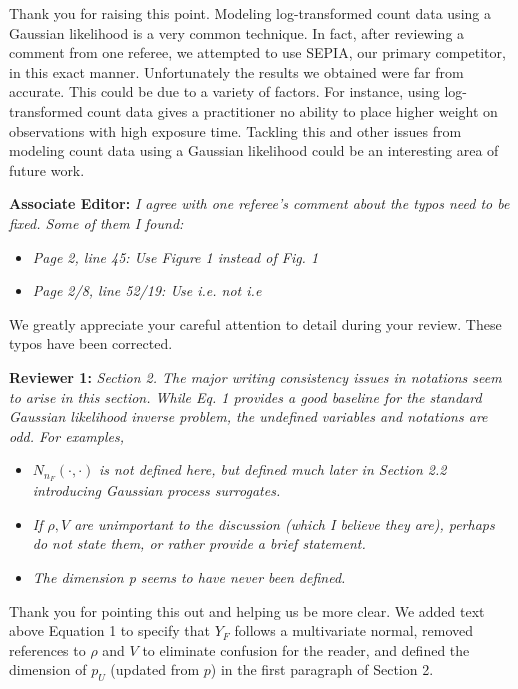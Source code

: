 \documentclass[12pt]{article}
\begin{document}
\bigskip
\noindent
Thank you for raising this point. Modeling log-transformed count data using a
Gaussian likelihood is a very common technique. In fact, after reviewing a
comment from one referee, we attempted to use SEPIA, our primary competitor,
in this exact manner. Unfortunately the results we obtained were far from
accurate. This could be due to a variety of factors. For instance, using
log-transformed count data gives a practitioner no ability to place higher
weight on observations with high exposure time. Tackling this and other issues
from modeling count data using a Gaussian likelihood could be an interesting
area of future work.

\bigskip
\noindent
\textbf{Associate Editor:} \textit{I agree with one referee's comment about the
typos need to be fixed. Some of them I found:}

\begin{itemize}
	\item \textit{Page 2, line 45: Use Figure 1 instead of Fig. 1}
	\item \textit{Page 2/8, line 52/19: Use i.e. not i.e}
\end{itemize}

\bigskip
\noindent
We greatly appreciate your careful attention to detail during your review.
These typos have been corrected.

\bigskip
\noindent
\textbf{Reviewer 1:} \textit{Section 2. The major writing consistency issues
in notations seem to arise in this section. While Eq. 1 provides a good
baseline for the standard Gaussian likelihood inverse problem, the undefined
variables and notations are odd. For examples, }

\begin{itemize}
	\item $N_{n_F} (\cdot, \cdot)$ \textit{is not defined here, but defined
much later in Section 2.2 introducing Gaussian process surrogates.}
	\item \textit{If \(\rho, V\) are unimportant to the discussion (which I believe
they are), perhaps do not state them, or rather provide a brief statement.}
	\item \textit{The dimension p seems to have never been defined.}
\end{itemize}

\bigskip
\noindent
Thank you for pointing this out and helping us be more clear. We added text
above Equation 1 to specify that $Y_F$ follows a multivariate normal, removed
references to $\rho$ and $V$ to eliminate confusion for the reader, and
defined the dimension of $p_U$ (updated from $p$) in the first paragraph of
Section 2.
\end{document}
